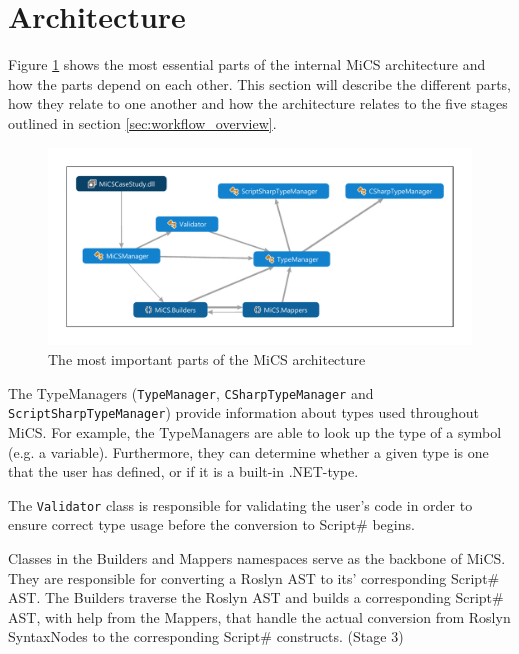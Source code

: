 \section{Architecture} %
\label{sec:architecture}
Figure \ref{fig:dependencygraph} shows the most essential parts of the internal MiCS architecture and how the parts depend on each other. 
This section will describe the different parts, how they relate to one another and how the architecture relates to the five stages outlined in section \ref{sec:workflow_overview}. 

\begin{figure}
	\begin{center}
		\centerline{\includegraphics[width=18cm]{resources/images/dependencygraph.pdf}}
	\end{center}
	\caption{The most important parts of the MiCS architecture}
	\label{fig:dependencygraph}
\end{figure}


The TypeManagers (\texttt{TypeManager}, \texttt{CSharpTypeManager} and \texttt{ScriptSharpTypeManager}) provide information about types used throughout MiCS. For example, the TypeManagers are able to look up the type of a symbol (e.g. a variable). Furthermore, they can determine whether a given type is one that the user has defined, or if it is a built-in .NET-type.

The \texttt{Validator} class is responsible for validating the user's code in order to ensure correct type usage before the conversion to Script\# begins.

Classes in the Builders and Mappers namespaces serve as the backbone of MiCS. They are responsible for converting a Roslyn AST to its' corresponding Script\# AST. The Builders traverse the Roslyn AST and builds a corresponding Script\# AST, with help from the Mappers, that handle the actual conversion from Roslyn SyntaxNodes to the corresponding Script\# constructs. (Stage 3)

